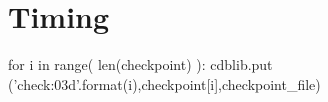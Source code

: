\documentclass[12pt]{cdblatex}
\begin{document}
\clearpage

\section*{Timing}



\bgroup
{}
\begin{cadabra}
   for i in range( len(checkpoint) ):
      cdblib.put ('check{:03d}'.format(i),checkpoint[i],checkpoint_file)
\end{cadabra}
\egroup
\end{document}
